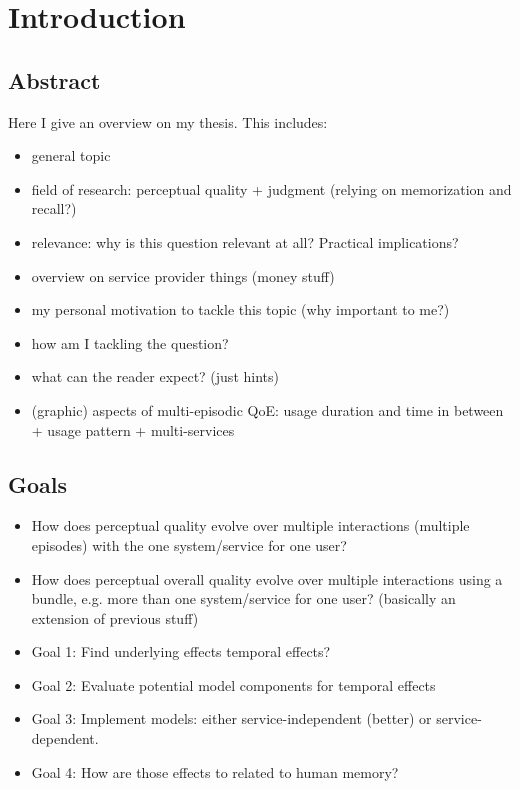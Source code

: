 \chapter{Introduction}
\section*{Abstract}
Here I give an overview on my thesis.
This includes:
\begin{itemize}
\item general topic
\item field of research: perceptual quality + judgment (relying on memorization and recall?)
\item relevance: why is this question relevant at all? Practical implications?
\item overview on service provider things (money stuff)
\item my personal motivation to tackle this topic (why important to me?)
\item how am I tackling the question?
\item what can the reader expect? (just hints)
\item (graphic) aspects of multi-episodic QoE: usage duration and time in between + usage pattern + multi-services
\end{itemize}

\section{Goals}
\begin{itemize}
\item How does perceptual quality evolve over multiple interactions (multiple episodes) with the one system/service for one user?
\item How does perceptual overall quality evolve over multiple interactions using a bundle, e.g. more than one system/service for one user? (basically an extension of previous stuff)
\item Goal 1: Find underlying effects temporal effects? 
\item Goal 2: Evaluate potential model components for temporal effects
\item Goal 3: Implement models: either service-independent (better) or service-dependent.
\item Goal 4: How are those effects to related to human memory?
\end{itemize}

